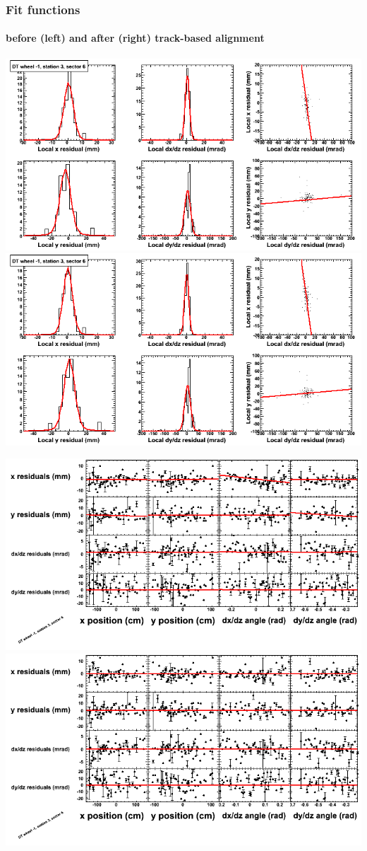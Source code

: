 \documentclass[compress]{beamer}
\begin{document}
\begin{frame}
\frametitle{Fit functions}
\framesubtitle{before (left) and after (right) track-based alignment}
\includegraphics[width=0.5\linewidth]{fitfunctions_re01/MBwhBst3sec06_bellcurves.png} \includegraphics[width=0.5\linewidth]{fitfunctions_re05/MBwhBst3sec06_bellcurves.png}

\includegraphics[width=0.5\linewidth]{fitfunctions_re01/MBwhBst3sec06_polynomials.png} \includegraphics[width=0.5\linewidth]{fitfunctions_re05/MBwhBst3sec06_polynomials.png}
\end{frame}
\end{document}
